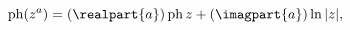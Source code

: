 \[\mathop{\mathrm{ph}\/}\nolimits\!\left(z^{a}\right)=(\realpart{a})\mathop{%
\mathrm{ph}\/}\nolimits z+(\imagpart{a})\mathop{\ln\/}\nolimits|z|,\]